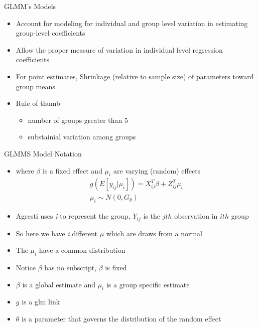 \documentclass[ignorenonframetext,]{beamer}
\providecommand{\tightlist}{%
  \setlength{\itemsep}{0pt}\setlength{\parskip}{0pt}}
\begin{document}
\begin{frame}{GLMM's Models}

\begin{itemize}
\tightlist
\item
  Account for modeling for individual and group level variation in
  estimating group-level coefficients
\item
  Allow the proper measure of variation in individual level regression
  coefficients
\item
  For point estimates, Shrinkage (relative to sample size) of parameters
  toward group means
\item
  Rule of thumb \small

  \begin{itemize}
  \item number of groups greater than 5
  \item substainial variation among groups
  \end{itemize}
\end{itemize}

\end{frame}

\begin{frame}{GLMMS Model Notation}

\begin{itemize}
\item
  where \(\beta\) is a fixed effect and \(\mu_i\) are varying (random)
  effects \[
  \begin{aligned}
  g(E[y_{ij}|\mu_i]) = X^T_{ij}\beta + Z^T_{ij}\mu_i \\
  \mu_{i} \sim N(0, G_\theta)
  \end{aligned}
  \]
\item
  Agresti uses \emph{i} to represent the group, \(Y_{ij}\) is the
  \(jth\) observation in \(ith\) group
\item
  So here we have \emph{i} different \(\mu\) which are draws from a
  normal
\item
  The \(\mu_i\) have a common distribution
\item
  Notice \(\beta\) has no subscript, \(\beta\) is fixed
\item
  \(\beta\) is a global estimate and \(\mu_i\) is a group specific
  estimate
\item
  \(g\) is a glm link
\item
  \(\theta\) is a parameter that governs the distribution of the random
  effect
\end{itemize}

\end{frame}
\end{document}

